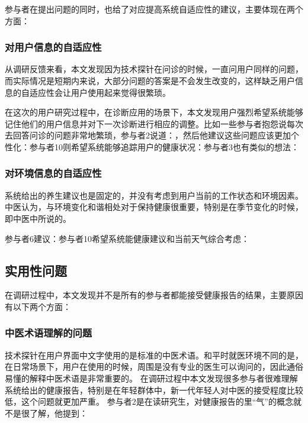 参与者在提出问题的同时，也给了对应提高系统自适应性的建议，主要体现在两个方面：

\subsubsection{对用户信息的自适应性}

从调研反馈来看，本文发现因为技术探针在问诊的时候，一直问用户同样的问题，而实际情况是短期内来说，大部分问题的答案是不会发生改变的，这样缺乏用户信息的自适应性会让用户使用起来觉得很繁琐。

在这次的用户研究过程中，在诊断应用的场景下，本文发现用户强烈希望系统能够记住他们的用户信息并对下一次诊断进行相应的调整。比如一些参与者抱怨说每次去回答问诊的问题非常地繁琐，参与者2说道：，然后他建议这些问题应该更加个性化：参与者10则希望系统能够追踪用户的健康状况：参与者3也有类似的想法：

\subsubsection{对环境信息的自适应性}

系统给出的养生建议也是固定的，并没有考虑到用户当前的工作状态和环境因素。中医认为，与环境变化和谐相处对于保持健康很重要，特别是在季节变化的时候，即中医中所说的。

参与者6建议：参与者10希望系统能健康建议和当前天气综合考虑：


\subsection{实用性问题}
在调研过程中，本文发现并不是所有的参与者都能接受健康报告的结果，主要原因有以下两个方面：

\subsubsection{中医术语理解的问题}

技术探针在用户界面中文字使用的是标准的中医术语。和平时就医环境不同的是，在日常场景下，用户在使用的时候，周围是没有专业的医生可以询问的，因此通俗易懂的解释中医术语是非常重要的。
在调研过程中本文发现很多参与者很难理解系统给出的健康报告，特别是在年轻群体中，新一代年轻人对中医的接受程度比较低，这个问题就更加严重。
参与者2是在读研究生，对健康报告的里“气”的概念就不是很了解，他提到：

